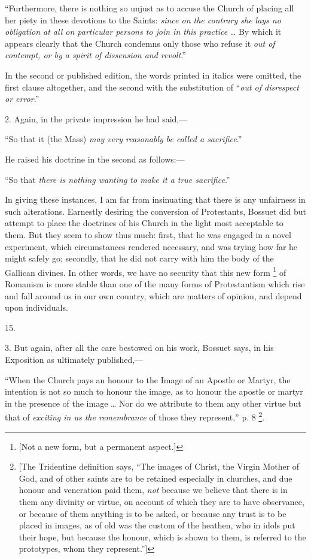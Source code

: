 ``Furthermore,
there is nothing so unjust as to accuse the Church of placing all her
piety in these devotions to the Saints: \emph{since on the contrary she
lays no obligation at all on particular persons to join in this
practice} … By which it appears clearly that the Church condemns
only those who refuse it \emph{out of contempt, or by a spirit of
dissension and revolt}.''

In the second or published edition, the words
printed in italics were omitted, the first clause altogether, and the
second with the substitution of ``\emph{out of disrespect or error}.''

2. Again, in the private
impression he had said,—

``So that it (the
Mass) \emph{may very reasonably be called a sacrifice}.''

He raised his doctrine in the second as
follows:—

``So
that \emph{there is nothing wanting to make it a true sacrifice}.''

In giving these instances, I am far from
insinuating that there is any unfairness in such alterations.
Earnestly desiring the conversion of Protestants, Bossuet did but
attempt to place the doctrines of his Church in the light most
acceptable to them. But they seem to show thus much: first, that he
was engaged in a novel experiment, which circumstances rendered
necessary, and was trying how far he might safely go; secondly, that
he did not carry with him the body of the Gallican divines. In other
words, we have no security that this new form \footnote{[Not a new form, but a permanent aspect.]} of Romanism is more stable than one of the many forms of
Protestantism which rise and fall around us in our own country,
which are matters of opinion, and depend upon individuals.

15.

3. But again, after all the care bestowed on his
work, Bossuet says, in his Exposition as ultimately published,—

``When
the Church pays an honour to the Image of an Apostle or Martyr, the
intention is not so much to honour the image, as to honour the apostle
or martyr in the presence of the image … Nor do we attribute to them
any other virtue but that of \emph{exciting in us the remembrance} of
those they represent,'' p. 8 \footnote{[The Tridentine definition says, ``The images of Christ, the Virgin
Mother of God, and of other saints are to be retained especially in
churches, and due honour and veneration paid them, \emph{not} because
we believe that there is in them any divinity or virtue, on account of
which they are to have observance, or because of them anything is to
be asked, or because any trust is to be placed in images, as of old
was the custom of the heathen, who in idols put their hope, but
because the honour, which is shown to them, is referred to the
prototypes, whom they represent.'']}.

